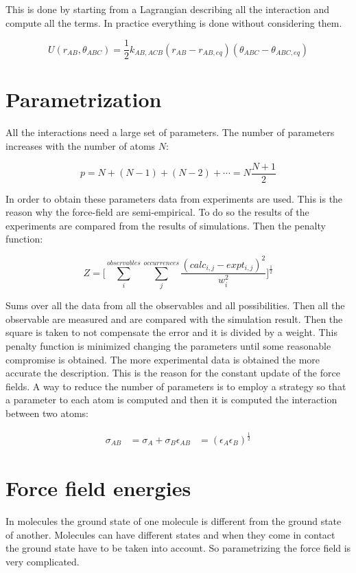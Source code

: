 This is done by starting from a Lagrangian describing all the interaction and compute all the terms.
In practice everything is done without considering them.

$$U(r_{AB}, \theta_{ABC}) = \frac{1}{2}k_{AB,ACB}(r_{AB}-r_{AB, eq})(\theta_{ABC}-\theta_{ABC, eq})$$

\section{Parametrization}
All the interactions need a large set of parameters.
The number of parameters increases with the number of atoms $N$:

$$p = N + (N-1)+(N-2)+\cdots = N\frac{N+1}{2}$$

In order to obtain these parameters data from experiments are used.
This is the reason why the force-field are semi-empirical.
To do so the results of the experiments are compared from the results of simulations.
Then the penalty function:

$$Z = \biggl[\sum\limits_{i}^{observables}\sum\limits_{j}^{occurrences}\frac{(calc_{i,j}-expt_{i,j})^2}{w_i^2}\biggr]^{\frac{1}{2}}$$

Sums over all the data from all the observables and all possibilities.
Then all the observable are measured and are compared with the simulation result.
Then the square is taken to not compensate the error and it is divided by a weight.
This penalty function is minimized changing the parameters until some reasonable compromise is obtained.
The more experimental data is obtained the more accurate the description.
This is the reason for the constant update of the force fields.
A way to reduce the number of parameters is to employ a strategy so that a parameter to each atom is computed and then it is computed the interaction between two atoms:

\begin{align*}
	\sigma_{AB} &= \sigma_A+\sigma_B
	\epsilon_{AB} &= (\epsilon_A\epsilon_B)^{\frac{1}{2}}
\end{align*}

\section{Force field energies}
In molecules the ground state of one molecule is different from the ground state of another.
Molecules can have different states and when they come in contact the ground state have to be taken into account.
So parametrizing the force field is very complicated.

